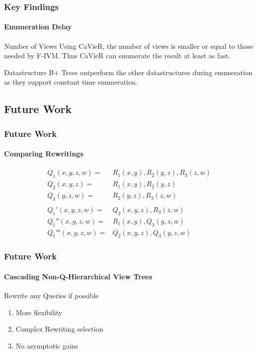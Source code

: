 \documentclass[
	11pt, %
]{beamer}
\begin{document}
\begin{frame}
	\frametitle{Key Findings}
	\framesubtitle{Enumeration Delay}
	\begin{block}{Number of Views}
		Using CaVieR, the number of views is smaller or equal to those needed by F-IVM. Thus CaVieR can enumerate the result at least as fast.
	\end{block}
	\begin{block}{Datastructure}
		B+ Trees outperform the other datastructures during enumeration as they support constant time enumeration.
	\end{block}
\end{frame}

\subsection{Future Work}
\begin{frame}
	\frametitle{Future Work }
	\framesubtitle{Comparing Rewritings}
	\begin{align*}
		Q_1(x,y,z,w) =&  R_1(x,y), R_2(y,z), R_3(z,w)\\
		Q_2(x,y,z) =&  R_1(x,y), R_2(y,z)\\
		Q_3(y,z,w)=&  R_2(y,z), R_3(z,w)\\\\
		Q_1'(x,y,z,w) =& Q_2(x,y,z), R_3(z,w)\\
		Q_1''(x,y,z,w) =&  R_1(x,y), Q_3(y,z,w)\\
		Q_1'''(x,y,z,w) =&  Q_2(x,y,z), Q_3(y,z,w)
	\end{align*}
\end{frame}

\begin{frame}
	\frametitle{Future Work}
	\framesubtitle{Cascading Non-Q-Hierarchical View Trees}
	\begin{block}{Rewrite any Queries if possible}
		\begin{enumerate}
			\item More flexibility
			\item Complex Rewriting selection
			\item No asymptotic gains
		\end{enumerate}
	\end{block}
\end{frame}
\end{document}
